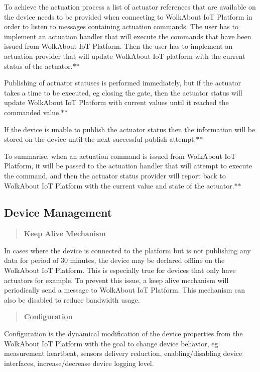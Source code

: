 To achieve the actuation process a list of actuator references that are available on the device needs to be provided when connecting to Wolk\+About IoT Platform in order to listen to messages containing actuation commands. The user has to implement an actuation handler that will execute the commands that have been issued from Wolk\+About IoT Platform. Then the user has to implement an actuation provider that will update Wolk\+About IoT platform with the current status of the actuator.$\ast$$\ast$

Publishing of actuator statuses is performed immediately, but if the actuator takes a time to be executed, eg closing the gate, then the actuator status will update Wolk\+About IoT Platform with current values until it reached the commanded value.$\ast$$\ast$

If the device is unable to publish the actuator status then the information will be stored on the device until the next successful publish attempt.$\ast$$\ast$

To summarise, when an actuation command is issued from Wolk\+About IoT Platform, it will be passed to the actuation handler that will attempt to execute the command, and then the actuator status provider will report back to Wolk\+About IoT Platform with the current value and state of the actuator.$\ast$$\ast$

\subsection*{Device Management}

\label{_keep-alive-mechanism}%
 \begin{quote}
{\bfseries Keep Alive Mechanism} \end{quote}
In cases where the device is connected to the platform but is not publishing any data for period of 30 minutes, the device may be declared offline on the Wolk\+About IoT Platform. This is especially true for devices that only have actuators for example. To prevent this issue, a keep alive mechanism will periodically send a message to Wolk\+About IoT Platform. This mechanism can also be disabled to reduce bandwidth usage.

\label{_configuration}%
 \begin{quote}
{\bfseries Configuration} \end{quote}
Configuration is the dynamical modification of the device properties from the Wolk\+About IoT Platform with the goal to change device behavior, eg measurement heartbeat, sensors delivery reduction, enabling/disabling device interfaces, increase/decrease device logging level.

